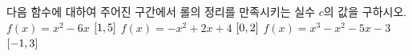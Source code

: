 다음 함수에 대하여 주어진 구간에서 롤의 정리를 만족시키는 실수 $c$의 값을 구하시오.
 $f(x)=x^2-6x$ \quad $[1{,}\mkern3mu\mathopen{}5]$
 $f(x)=-x^2+2x+4$ \quad $[0{,}\mkern3mu\mathopen{}2]$
 $f(x)=x^3-x^2-5x-3$ \quad $[-1{,}\mkern3mu\mathopen{}3]$

